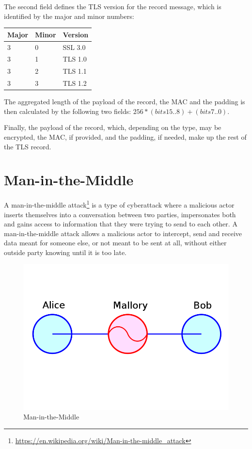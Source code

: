 The second field defines the TLS version for the record message, which is
identified by the major and minor numbers:

\begin{table}[H] \centering \begin{tabular}{ | l | l | l | } \hline
\textbf{Major} & \textbf{Minor} & \textbf{Version} \\ \hline 3 & 0 & SSL 3.0 \\
3 & 1 & TLS 1.0 \\ 3 & 2 & TLS 1.1 \\ 3 & 3 & TLS 1.2 \\ \hline \end{tabular}
\end{table}

The aggregated length of the payload of the record, the MAC and the padding is
then calculated by the following two fields: \begin{math}256*(bits 15..8) +
(bits 7..0)\end{math}.

Finally, the payload of the record, which, depending on the type, may be
encrypted, the MAC, if provided, and the padding, if needed, make up the rest of
the TLS record.

\section{Man-in-the-Middle}\label{sec:mitm}

A man-in-the-middle attack\footnote{\url{https://en.wikipedia.org/wiki/Man-in-the-middle_attack}}
is a type of cyberattack where a malicious actor inserts themselves into a conversation
between two parties, impersonates both and gains access to information that they were
trying to send to each other. A man-in-the-middle attack allows a malicious actor 
to intercept, send and receive data meant for someone else, or not meant to be sent at all, 
without either outside party knowing until it is too late. 

\begin{figure}[H] \caption{Man-in-the-Middle} \centering
\includegraphics[width=1\textwidth]{diagrams/mitm.png}\end{figure}


